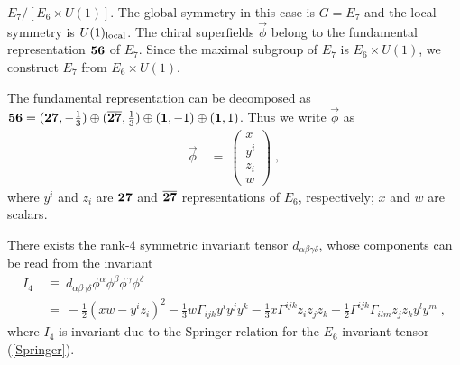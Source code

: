 \documentclass[a4paper,11pt]{article}
\newcommand{\half}{\frac{1}{2}}
\newcommand{\ol}{\overline}
\newcommand{\ul}{\underline}
\begin{document}
{%

\ul{\sl $E_7 / [ E_6 \times U(1)]$}. \hfil\break
The global symmetry in this case is 
$G = E_7$ and the local symmetry is $U(1)_{\rm local}$.
The chiral superfields $\vec{\phi}$ belong to the fundamental 
representation ${\bf 56}$ of $E_7$. 
Since the maximal subgroup of $E_7$ is $E_6 \times U(1)$, 
we construct $E_7$ from $E_6 \times U(1)$. 

The fundamental representation can be decomposed as
${\bf 56} = ({\bf 27}, -\frac{1}{3})\oplus ({\bf \ol{27}},\frac{1}{3}) 
\oplus ({\bf 1},-1) \oplus ({\bf 1},1)$. 
Thus we write $\vec{\phi}$ as 
\begin{align}
 \vec{\phi} \ &= \ \left(
\begin{array}{c}
x \\
y^i \\ 
z_i \\
 w
\end{array} \right) \; ,  \label{decom.E7}
\end{align}
where $y^i$ and $z_i$ are ${\bf 27}$ and ${\bf \ol{27}}$
representations of $E_6$, 
respectively; $x$ and $w$ are scalars.

There exists 
the rank-$4$ symmetric invariant tensor 
$d_{\alpha \beta \gamma \delta}$, 
whose components can be read from the invariant~\cite{HN1}
\begin{align}
 I_4 \ &\equiv \ d_{\alpha \beta \gamma \delta} 
     \phi^{\alpha} \phi^{\beta} \phi^{\gamma} \phi^{\delta} \nonumber \\
\ &= \ -\half (x w - y^i z_i)^2 
-\frac{1}{3} w \Gamma_{ijk} y^i y^j y^k 
- \frac{1}{3} x \Gamma^{ijk} z_i z_j z_k 
+ \half \Gamma^{ijk} \Gamma_{ilm} z_j z_k y^l y^m \; ,\label{I4}
\end{align}
where $I_4$ is invariant due to the Springer relation 
for the $E_6$ invariant tensor (\ref{Springer}). 

}
\end{document}
